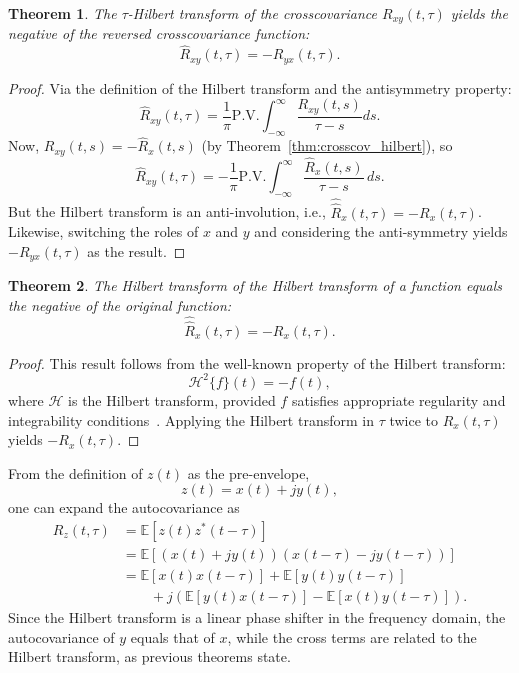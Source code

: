 \documentclass[12pt]{article}
\newtheorem{theorem}{Theorem}[section]
\begin{document}
\begin{theorem}
\label{thm:hilbert_cross}
The $\tau$-Hilbert transform of the crosscovariance $R_{xy}(t,\tau)$ yields the negative of the reversed crosscovariance function:
\begin{equation}
\hat{R}_{xy}(t, \tau) = -R_{yx}(t, \tau).
\label{eq:hilbert_cross}
\end{equation}
\end{theorem}
\begin{proof}
Via the definition of the Hilbert transform and the antisymmetry property:
\[
\hat{R}_{xy}(t,\tau) = \frac{1}{\pi} \mathrm{P.V.} \int_{-\infty}^\infty \frac{R_{xy}(t,s)}{\tau-s} ds .
\]
Now, $R_{xy}(t,s) = -\hat{R}_x(t,s)$ (by Theorem~\ref{thm:crosscov_hilbert}), so
\[
\hat{R}_{xy}(t,\tau) = - \frac{1}{\pi} \mathrm{P.V.} \int_{-\infty}^{\infty} \frac{\hat{R}_x(t,s)}{\tau-s} \, ds.
\]
But the Hilbert transform is an anti-involution, i.e., $\hat{\hat{R}}_x(t,\tau) = -R_x(t,\tau)$. Likewise, switching the roles of $x$ and $y$ and considering the anti-symmetry yields $-R_{yx}(t,\tau)$ as the result.
\end{proof}

\begin{theorem}
\label{thm:hilbert_of_hilbert}
The Hilbert transform of the Hilbert transform of a function equals the negative of the original function:
\begin{equation}
\hat{\hat{R}}_x(t, \tau) = -R_x(t, \tau).
\label{eq:hilbert_of_hilbert}
\end{equation}
\end{theorem}
\begin{proof}
This result follows from the well-known property of the Hilbert transform:
\[
\mathcal{H}^2\{f\}(t) = -f(t),
\]
where $\mathcal{H}$ is the Hilbert transform, provided $f$ satisfies appropriate regularity and integrability conditions~\cite{davenport1958}.
Applying the Hilbert transform in $\tau$ twice to $R_x(t, \tau)$ yields $-R_x(t, \tau)$.
\end{proof}

From the definition of $z(t)$ as the pre-envelope,
\begin{equation}
z(t) = x(t) + jy(t),
\label{eq:preenvelope}
\end{equation}
one can expand the autocovariance as
\begin{align*}
R_z(t,\tau) &= \mathbb{E}[z(t) z^*(t-\tau)] \\
&= \mathbb{E}[(x(t) + j y(t))(x(t-\tau) - j y(t-\tau))] \\
&= \mathbb{E}[x(t)x(t-\tau)] + \mathbb{E}[y(t)y(t-\tau)] \\
&\qquad + j\left( \mathbb{E}[y(t)x(t-\tau)] - \mathbb{E}[x(t)y(t-\tau)] \right).
\end{align*}
Since the Hilbert transform is a linear phase shifter in the frequency domain,
the autocovariance of $y$ equals that of $x$, while
the cross terms are related to the Hilbert transform, as previous theorems state.
\end{document}
